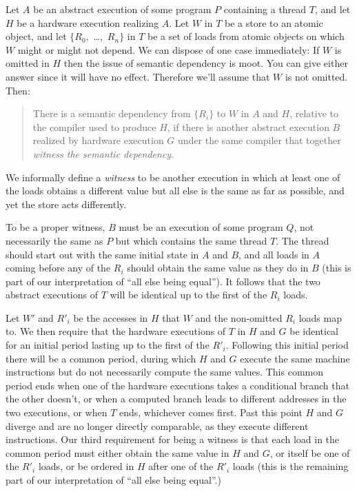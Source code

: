Let $A$ be an abstract execution of some program $P$ containing a
thread $T$, and let $H$ be a hardware execution realizing $A$.
Let $W$ in $T$ be a store to an atomic object, and let $\{R_0,$
\ldots,~$R_n\}$ in $T$ be a set of loads from atomic objects on which
$W$ might or might not depend.
We can dispose of one case immediately: If $W$ is omitted in $H$ then
the issue of semantic dependency is moot.
You can give either answer since it will have no effect.
Therefore we'll assume that $W$ is not omitted.
Then:
\begin{quote}
There is a semantic dependency from $\{R_i\}$ to $W$ in $A$ and $H$,
relative to the compiler used to produce $H$, if there is another
abstract execution $B$ realized by hardware execution $G$ under the
same compiler that together \emph{witness the semantic dependency}.
\end{quote}

We informally define a \emph{witness} to be another execution in which
at least one of the loads obtains a different value but all else is the
same as far as possible, and yet the store acts differently.

To be a proper witness, $B$ must be an execution of some program $Q$,
not necessarily the same as $P$ but which contains the same thread $T$.
The thread should start out with the same initial state in $A$ and
$B$, and all loads in $A$ coming before any of the $R_i$ should obtain
the same value as they do in $B$ (this is part of our interpretation
of ``all else being equal'').
It follows that the two abstract executions of $T$ will be identical
up to the first of the $R_i$ loads.

Let $W'$ and $R'_i$ be the accesses in $H$ that $W$ and the
non-omitted $R_i$ loads map to.
We then require that the hardware executions of $T$ in $H$ and $G$ be
identical for an initial period lasting up to the first of the $R'_i$.
Following this initial period there will be a common period, during
which $H$ and $G$ execute the same machine instructions but do not
necessarily compute the same values.
This common period ends when one of the hardware executions
takes a conditional branch that the other doesn't, or when a computed
branch leads to different addresses in the two executions, or when $T$
ends, whichever comes first.
Past this point $H$ and $G$ diverge and are no longer directly
comparable, as they execute different instructions.
Our third requirement for being a witness is that each load in the
common period must either obtain the same value in $H$ and $G$, or
itself be one of the $R'_i$ loads, or be ordered in $H$
after one of the $R'_i$ loads (this is the remaining part of our
interpretation of ``all else being equal''.)

